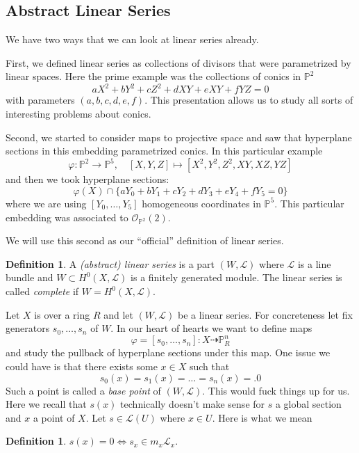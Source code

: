 \documentclass[12pt]{article}
\numberwithin{equation}{section}
\theoremstyle{definition}
\newtheorem{definition}[theorem]{Definition}
\theoremstyle{remark}
\newcommand{\Ocal}{\mathcal{O}}
\newcommand{\PP}{\mathbb{P}}
\newcommand{\Lcal}{\mathcal{L}}
\begin{document}
\subsection{Abstract Linear Series}
We have two ways that we can look at linear series already. 

First, we defined linear series as collections of divisors that were parametrized by linear spaces. 
Here the prime example was the collections of conics in $\PP^2$ 
 $$ aX^2 + bY^2+cZ^2+dXY+eXY+fYZ=0$$
with parameters $(a,b,c,d,e,f)$.
This presentation allows us to study all sorts of interesting problems about conics. 

Second, we started to consider maps to projective space and saw that hyperplane sections in this embedding parametrized conics. 
In this particular example 
$$\varphi:\PP^2\to \PP^5, \quad [X,Y,Z] \mapsto [X^2,Y^2,Z^2,XY,XZ,YZ] $$
and then we took hyperplane sections: 
 $$ \varphi(X) \cap \lbrace a Y_0 + b Y_1 + c Y_2 + d Y_3 + e Y_4 +f Y_5= 0 \rbrace$$
where we are using $[Y_0,\ldots,Y_5]$ homogeneous coordinates in $\PP^5$. 
This particular embedding was associated to $\Ocal_{\PP^2}(2)$.

We will use this second as our ``official'' definition of linear series.
\begin{definition}
	A \emph{(abstract) linear series} is a part $(W,\Lcal)$ where $\Lcal$ is a line bundle and $W \subset H^0(X,\Lcal)$ is a finitely generated module. 
	The linear series is called \emph{complete} if $W = H^0(X,\Lcal)$.
\end{definition}
Let $X$ is over a ring $R$ and let $(W,\Lcal)$ be a linear series. 
For concreteness let fix generators $s_0,\ldots,s_n$ of $W$. 
In our heart of hearts we want to define maps 
\begin{equation}\label{eqn:rational-map}
 \varphi = [s_0,\ldots,s_n]: X \dashrightarrow \PP^n_R
\end{equation}
and study the pullback of hyperplane sections under this map. 
One issue we could have is that there exists some $x\in X$ such that 
$$s_0(x)=s_1(x)=\ldots=s_n(x)=.0$$
Such a point is called a \emph{base point} of $(W,\Lcal)$. 
This would fuck things up for us.
Here we recall that $s(x)$ technically doesn't make sense for $s$ a global section and $x$ a point of $X$. 
Let $s \in \Lcal(U)$ where $x\in U$. 
Here is what we mean
\begin{definition}
	$s(x)=0 \iff s_x \in m_x \Lcal_x.$
\end{definition}
\end{document}

